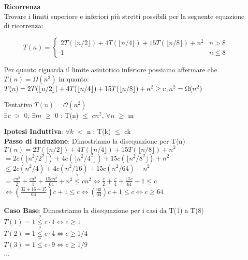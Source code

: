\documentclass[../cheatSheetAlgoritmi.tex]{subfiles}
\begin{document}
\bigskip
\textbf{Ricorrenza}\\
Trovare i limiti superiore e inferiori più stretti possibili per la seguente equazione di ricorrenza:
\begin{center}
	\begin{equation*}
  		T(n)=\begin{cases}
			2T(\lfloor n/2 \rfloor) + 4T(\lfloor n/4 \rfloor) + 15T(\lfloor n/8 \rfloor) + n^{2} & \text{$n > 8$}\\
			1 & \text{$n \leq 8$}	
  	\end{cases}
	\end{equation*}
\end{center}
Per quanto riguarda il limite asintotico inferiore possiamo affermare che $T(n) = \Omega(n^{2})$ in quanto:\\
$T(n) = 2T(\lfloor n/2 \rfloor) + 4T(\lfloor n/4 \rfloor) + 15T(\lfloor n/8 \rfloor) + n^{2} \geq c\textsubscript{1}n^{2} = \Omega(n^{2})$

\bigskip
Tentativo $T(n) = \mathcal{O}(n^{2})$\\
$\exists c$ $>$ 0, $\exists m$ $\geq$ 0 : T(n) $\leq$ $cn^{2}$, $\forall n$ $\geq$ m

\bigskip
\textbf{Ipotesi Induttiva}: $\forall k$ $<$ n : T(k) $\leq$ ck\\
\textbf{Passo di Induzione}: Dimostriamo la disequazione per T(n)\\
$T(n) = 2T(\lfloor n/2 \rfloor) + 4T(\lfloor n/4 \rfloor) + 15T(\lfloor n/8 \rfloor) + n^{2}$\\
$= 2c(\lfloor n^{2}/2^{2} \rfloor) + 4c(\lfloor n^{2}/4^{2} \rfloor) + 15c(\lfloor n^{2}/8^{2} \rfloor) + n^{2}$\\
$\leq 2c(n^{2}/4) + 4c(n^{2}/16) + 15c(n^{2}/64) + n^{2}$\\
$= \frac{cn^{2}}{2} + \frac{cn^{2}}{4} + \frac{15cn^{2}}{64} + n^{2}  \stackrel{?}{\leq} cn^{2} \iff \frac{c}{2} + \frac{c}{4} + \frac{15c}{64} + 1  \leq c$\\
$\iff (\frac{32 + 16 + 15}{64})c + 1 \leq c \iff (\frac{63}{64})c + 1 \leq c \iff c \geq 64$

\bigskip
\textbf{Caso Base}: Dimostriamo la disequazione per i casi da T(1) a T(8)\\
$T(1) = 1 \stackrel{?}{\leq} c \cdot 1 \iff c \geq 1$\\
$T(2) = 1 \stackrel{?}{\leq} c \cdot 4 \iff c \geq 1/4$\\
$T(3) = 1 \stackrel{?}{\leq} c \cdot 9 \iff c \geq 1/9$\\
...
\bigskip
\end{document}

